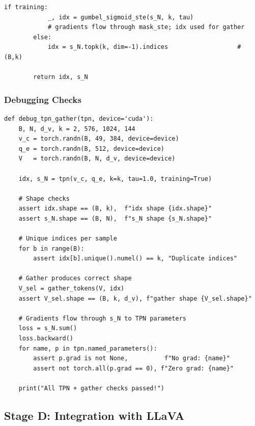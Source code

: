 \documentclass[11pt,a4paper]{article}
\begin{document}
\begin{lstlisting}[caption={TokenizationPolicyNetwork: full implementation.}]
        if training:
            _, idx = gumbel_sigmoid_ste(s_N, k, tau)
            # gradients flow through mask_ste; idx used for gather
        else:
            idx = s_N.topk(k, dim=-1).indices                   # (B,k)

        return idx, s_N
\end{lstlisting}

\subsubsection{Debugging Checks}

\begin{lstlisting}[caption={Comprehensive TPN and gather verification.}]
def debug_tpn_gather(tpn, device='cuda'):
    B, N, d_v, k = 2, 576, 1024, 144
    v_c = torch.randn(B, 49, 384, device=device)
    q_e = torch.randn(B, 512, device=device)
    V   = torch.randn(B, N, d_v, device=device)

    idx, s_N = tpn(v_c, q_e, k=k, tau=1.0, training=True)

    # Shape checks
    assert idx.shape == (B, k),  f"idx shape {idx.shape}"
    assert s_N.shape == (B, N),  f"s_N shape {s_N.shape}"

    # Unique indices per sample
    for b in range(B):
        assert idx[b].unique().numel() == k, "Duplicate indices"

    # Gather produces correct shape
    V_sel = gather_tokens(V, idx)
    assert V_sel.shape == (B, k, d_v), f"gather shape {V_sel.shape}"

    # Gradients flow through s_N to TPN parameters
    loss = s_N.sum()
    loss.backward()
    for name, p in tpn.named_parameters():
        assert p.grad is not None,          f"No grad: {name}"
        assert not torch.all(p.grad == 0), f"Zero grad: {name}"

    print("All TPN + gather checks passed!")
\end{lstlisting}

\subsection{Stage D: Integration with LLaVA}
\end{document}
